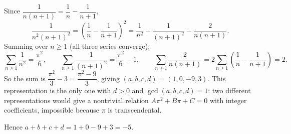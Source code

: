 Since $\dfrac{1}{n(n+1)}=\dfrac{1}{n}-\dfrac{1}{n+1}$,
\[
\dfrac{1}{n^2(n+1)^2}=\left(\dfrac{1}{n}-\dfrac{1}{n+1}\right)^2=\dfrac{1}{n^2}+\dfrac{1}{(n+1)^2}-\dfrac{2}{n(n+1)} .
\]
Summing over $n\ge1$ (all three series converge):
\[
\sum_{n\ge1}\dfrac{1}{n^2}=\dfrac{\pi^2}{6},\qquad\sum_{n\ge1}\dfrac{1}{(n+1)^2}=\dfrac{\pi^2}{6}-1,\qquad\sum_{n\ge1}\dfrac{2}{n(n+1)}=2\sum_{n\ge1}\left(\dfrac{1}{n}-\dfrac{1}{n+1}\right)=2 .
\]
So the sum is $\dfrac{\pi^2}{3}-3=\dfrac{\pi^2-9}{3}$, giving $(a,b,c,d)=(1,0,-9,3)$. This representation is the only one with $d>0$ and $\gcd(a,b,c,d)=1$: two different representations would give a nontrivial relation $A\pi^2+B\pi+C=0$ with integer coefficients, impossible because $\pi$ is transcendental.

Hence $a+b+c+d=1+0-9+3=\boxed{-5}$.
